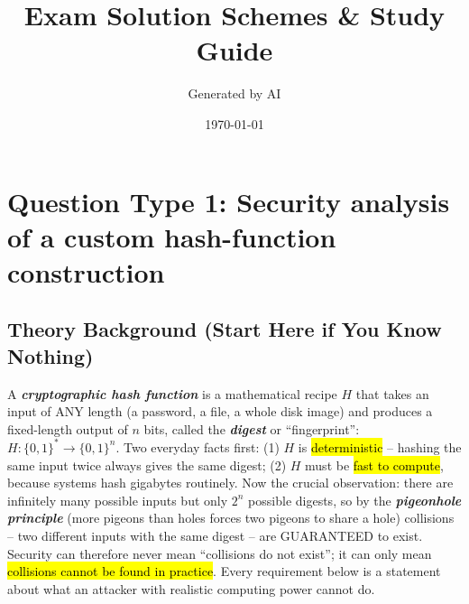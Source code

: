 \documentclass[12pt, a4paper]{article}
\newcommand{\term}[1]{\textbf{\textit{#1}}}        %
\newcommand{\imp}[1]{\hl{#1}}                       %
\begin{document}
\title{Exam Solution Schemes \& Study Guide}
\author{Generated by AI}
\date{\today}
\maketitle
\tableofcontents
\newpage

\section{Question Type 1: Security analysis of a custom hash-function construction}

\subsection*{Theory Background (Start Here if You Know Nothing)}
A \term{cryptographic hash function} is a mathematical recipe $H$ that takes an input of ANY length (a password, a file, a whole disk image) and produces a fixed-length output of $n$ bits, called the \term{digest} or ``fingerprint'': $H : \{0,1\}^{*} \rightarrow \{0,1\}^{n}$. Two everyday facts first: (1) $H$ is \imp{deterministic} -- hashing the same input twice always gives the same digest; (2) $H$ must be \imp{fast to compute}, because systems hash gigabytes routinely. Now the crucial observation: there are infinitely many possible inputs but only $2^{n}$ possible digests, so by the \term{pigeonhole principle} (more pigeons than holes forces two pigeons to share a hole) collisions -- two different inputs with the same digest -- are GUARANTEED to exist. Security can therefore never mean ``collisions do not exist''; it can only mean \imp{collisions cannot be found in practice}. Every requirement below is a statement about what an attacker with realistic computing power cannot do.
\end{document}
